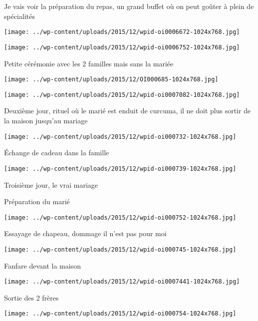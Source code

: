 Je vais voir la préparation du repas, un grand buffet où on peut goûter à plein de spécialités 
\begin{center} \texttt{[image: ../wp-content/uploads/2015/12/wpid-oi0006672-1024x768.jpg]} \end{center}
\begin{center} \texttt{[image: ../wp-content/uploads/2015/12/wpid-oi0006752-1024x768.jpg]} \end{center}

Petite cérémonie avec les 2 familles mais sans la mariée 
\begin{center} \texttt{[image: ../wp-content/uploads/2015/12/OI000685-1024x768.jpg]} \end{center}
\begin{center} \texttt{[image: ../wp-content/uploads/2015/12/wpid-oi0007082-1024x768.jpg]} \end{center}

Deuxième jour, rituel où le marié est enduit de curcuma, il ne doit plus sortir de la maison jusqu'au mariage 
\begin{center} \texttt{[image: ../wp-content/uploads/2015/12/wpid-oi000732-1024x768.jpg]} \end{center}
\pagebreak

Échange de cadeau dans la famille 
\begin{center} \texttt{[image: ../wp-content/uploads/2015/12/wpid-oi000739-1024x768.jpg]} \end{center}

Troisième jour, le vrai mariage

Préparation du marié 
\begin{center} \texttt{[image: ../wp-content/uploads/2015/12/wpid-oi000752-1024x768.jpg]} \end{center}
\pagebreak

Essayage de chapeau, dommage il n'est pas pour moi
\begin{center} \texttt{[image: ../wp-content/uploads/2015/12/wpid-oi000745-1024x768.jpg]} \end{center}

Fanfare devant la maison 
\begin{center} \texttt{[image: ../wp-content/uploads/2015/12/wpid-oi0007441-1024x768.jpg]} \end{center}
\pagebreak

Sortie des 2 frères 
\begin{center} \texttt{[image: ../wp-content/uploads/2015/12/wpid-oi000754-1024x768.jpg]} \end{center}

